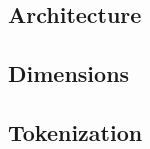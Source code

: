 \subsection{Architecture}
\label{subsec:arch}


\subsection{Dimensions}
\label{subsec:dimensions}


% 

\newpage
\subsection{Tokenization}
\label{subsec:tokenization}
